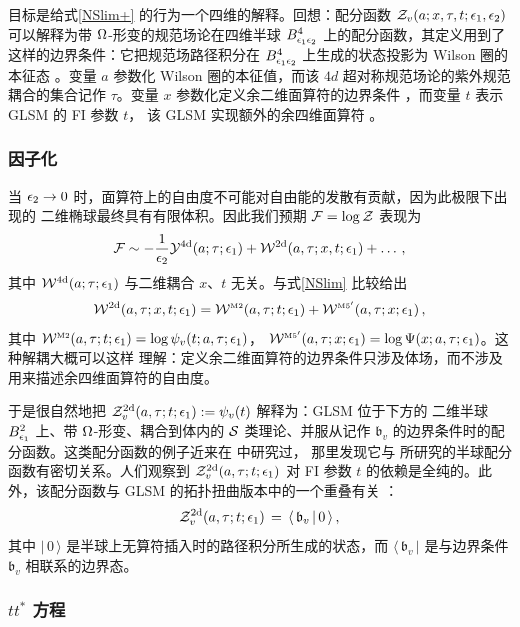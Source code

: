 目标是给式\eqref{NSlim+} 的行为一个四维的解释。回想：配分函数
$\mathcal{Z}_v(a;x,\tau,t;\epsilon_1,\epsilon_2)$ 可以解释为带 $\Omega$-形变的规范场论在四维半球
$B^4_{\epsilon_1\epsilon_2}$ 上的配分函数，其定义用到了这样的边界条件：它把规范场路径积分在
$B^4_{\epsilon_1\epsilon_2}$ 上生成的状态投影为 Wilson 圈的本征态 \cite{NW,TV13}。变量 $a$ 参数化
Wilson 圈的本征值，而该 $4d$ 超对称规范场论的紫外规范耦合的集合记作 $\tau$。变量 $x$
参数化定义余二维面算符的边界条件 \cite{FGT}，而变量 $t$ 表示 GLSM 的 FI 参数 $t$，
该 GLSM 实现额外的余四维面算符 \cite{AGGTV}。

\subsubsection{因子化}

当 $\epsilon_2\to 0$ 时，面算符上的自由度不可能对自由能的发散有贡献，因为此极限下出现的
二维椭球最终具有有限体积。因此我们预期 $\mathcal{F}=\log\mathcal{Z}$ 表现为
\begin{equation}
\mathcal{F}\sim-\frac{1}{\epsilon_2}\mathcal{Y}^{\rm 4d}(a;\tau;\epsilon_1)+\mathcal{W}^{\rm 2d}(a,\tau;x,t;\epsilon_1)+\dots\,,
\end{equation}
其中 $\mathcal{W}^{\rm 4d}(a;\tau;\epsilon_1)$ 与二维耦合 $x$、$t$ 无关。与式\eqref{NSlim} 比较给出
\[
\mathcal{W}^{\rm 2d}(a,\tau;x,t;\epsilon_1)=\mathcal{W}^{\rm\scriptscriptstyle M2}(a,\tau;t;\epsilon_1)
+\mathcal{W}^{\rm\scriptscriptstyle M5'}(a,\tau;x;\epsilon_1)\,,
\]
其中 $\mathcal{W}^{\rm\scriptscriptstyle M2}(a,\tau;t;\epsilon_1)=\log\psi_v(t;a,\tau;\epsilon_1)$，
$\mathcal{W}^{\rm\scriptscriptstyle M5'}(a,\tau;x;\epsilon_1)=\log\Psi(x;a,\tau;\epsilon_1)$。这种解耦大概可以这样
理解：定义余二维面算符的边界条件只涉及体场，而不涉及用来描述余四维面算符的自由度。

于是很自然地把 $\mathcal{Z}^{\rm 2d}_v(a,\tau;t;\epsilon_1):=\psi_v(t)$ 解释为：GLSM 位于下方的
二维半球 $B^2_{\epsilon_1}$ 上、带 $\Omega$-形变、耦合到体内的 $\mathcal{S}$ 类理论、并服从记作
$\mathfrak{b}_v$ 的边界条件时的配分函数。这类配分函数的例子近来在 \cite{FKNO} 中研究过，
那里发现它与 \cite{HO,HR} 所研究的半球配分函数有密切关系。人们观察到
$\mathcal{Z}^{\rm 2d}_v(a,\tau;t;\epsilon_1)$ 对 FI 参数 $t$ 的依赖是全纯的。此外，该配分函数与
GLSM 的拓扑扭曲版本中的一个重叠有关 \cite{HO,HR}：
\begin{equation}\label{Zoverlap}
\mathcal{Z}^{\rm 2d}_v(a,\tau;t;\epsilon_1)\,=\,\langle\,\mathfrak{b}_v\,|\,0\,\rangle\,,
\end{equation}
其中 $|\,0\,\rangle$ 是半球上无算符插入时的路径积分所生成的状态，而
$\langle\,\mathfrak{b}_v\,|$ 是与边界条件 $\mathfrak{b}_v$ 相联系的边界态。

\subsubsection{$tt^*$ 方程}

